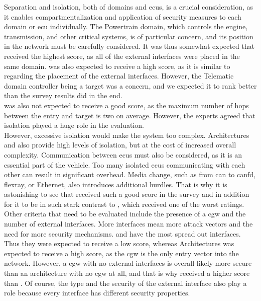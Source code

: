 Separation and isolation, both of domains and \acrshort{ecu}s, is a crucial consideration, as it enables compartmentalization and application of security measures to each domain or \acrshort{ecu} individually. 
The Powertrain domain, which controls the engine, transmission, and other critical systems, is of particular concern, and its position in the network must be carefully considered. 
It was thus somewhat expected that  received the highest score, as all of the external interfaces were placed in the same domain.
 was also expected to receive a high score, as it is similar to  regarding the placement of the external interfaces. However, the Telematic domain controller being a target was a concern, and we expected it to rank better than the survey results did in the end.\\
 was also not expected to receive a good score, as the maximum number of hops between the entry and target is two on average. However, the experts agreed that isolation played a huge role in the evaluation.\\

However, excessive isolation would make the system too complex. 
Architectures  and  also provide high levels of isolation, but at the cost of increased overall complexity.
Communication between \acrshort{ecu}s must also be considered, as it is an essential part of the vehicle. 
Too many isolated \acrshort{ecu}s communicating with each other can result in significant overhead. 
Media change, such as from \acrshort{can} to \acrshort{canfd}, \acrshort{flexray}, or Ethernet, also introduces additional hurdles.
That is why it is astonishing to see that  received such a good score in the survey
and in addition for it to be in such stark contrast to , which received one of the worst ratings.\\

Other criteria that need to be evaluated include the presence of a \acrshort{cgw} and the number of external interfaces. More interfaces mean more attack vectors and the need for more security mechanisms.
 and  have the most spread out interfaces. Thus they were expected to receive a low score,
whereas Architectures  was expected to receive a high score, as the \acrshort{cgw} is the only entry vector into the network.
However, a \acrshort{cgw} with no external interfaces is overall likely more secure than an architecture with no \acrshort{cgw} at all, and that is why 
 received a higher score than . 
Of course, the type and the security of the external interface also play a role because every interface has different security properties.\\


